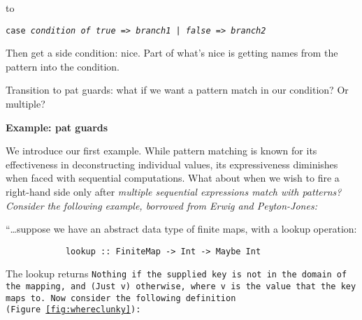 \documentclass[manuscript,screen,review, 12pt]{acmart}
\begin{document}
\begin{outline}[enumerate]
    to 
    
    \tt{case} \it{condition} \tt{of} \tt{true =>} \it{branch1} \tt{| false =>} \it{branch2}
    
     Then get a side condition: nice. 
     Part of what's nice is getting names from the pattern into the condition. 

     Transition to pat guards: 
     what if we want a pattern match in our condition? Or multiple? 

    
     \bf{Example: pat guards} 



            We introduce our first example. While pattern matching is known for
            its effectiveness in deconstructing individual values, its
            expressiveness diminishes when faced with sequential computations.
            What about when we wish to fire a right-hand side only after
            \it{multiple sequential expressions} match with patterns? Consider
            the following example, borrowed from Erwig and Peyton-Jones: 

    “\dots suppose we have an abstract data type of finite maps, with a lookup
    operation:
    
    \begin{center}
        \begin{verbatim}
            lookup :: FiniteMap -> Int -> Maybe Int
        \end{verbatim}
    \end{center}

    The lookup returns \tt{Nothing} if the supplied key is not in the domain of
    the mapping, and \tt{(Just v)} otherwise, where \tt{v} is the value that the
    key maps to. Now consider the following definition
    (Figure~\ref{fig:whereclunky}):


\end{outline}
\end{document}
